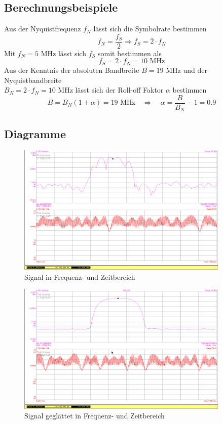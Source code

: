 \documentclass[12pt,a4paper,ngerman]{article}
\begin{document}
\subsection{Berechnungsbeispiele}
Aus der Nyquistfrequenz $f_N$ lässt sich die Symbolrate bestimmen
\begin{equation}
f_N = \frac{f_S}{2} \Rightarrow f_S = 2 \cdot f_N
\end{equation}
Mit $f_N = 5$ MHz lässt sich $f_S$ somit bestimmen als
\begin{equation}
f_S = 2 \cdot f_N = 10 \text{ MHz}
\end{equation}
Aus der Kenntnis der absoluten Bandbreite $B = 19$ MHz und der Nyquistbandbreite \\ $B_N = 2 \cdot f_N = 10$ MHz lässt sich der Roll-off Faktor $\alpha$ bestimmen
\begin{equation}
B = B_N(1+\alpha) = 19 \text{ MHz} \quad \Rightarrow \quad \alpha = \frac{B}{B_N} -1 = 0.9
\end{equation}



\subsection{Diagramme}
\begin{figure}[H]
\centering
\includegraphics[width=0.9\textwidth]{figures/Aufgabe1_QPSK.jpg} 
\caption{Signal in Frequenz- und Zeitbereich}
\label{fig:1_sig}
\end{figure}


\begin{figure}[H]
\centering
\includegraphics[width=0.9\textwidth]{figures/Aufgabe1_QPSK_avg.jpg} 
\caption{Signal geglättet in Frequenz- und Zeitbereich}
\label{fig:1_sig_avg}
\end{figure}
\end{document}
